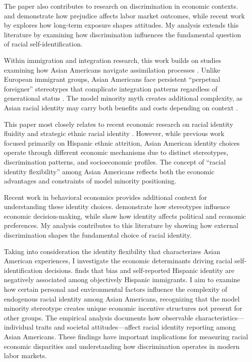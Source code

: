 The paper also contributes to research on discrimination in economic contexts. \textcite{bertrandAreEmilyGreg2004} and \textcite{charlesPrejudiceWagesEmpirical2008} demonstrate how prejudice affects labor market outcomes, while recent work by \textcite{bursztynImmigrantNextDoor2022} explores how long-term exposure shapes attitudes. My analysis extends this literature by examining how discrimination influences the fundamental question of racial self-identification.

Within immigration and integration research, this work builds on studies examining how Asian Americans navigate assimilation processes \autocite{abramitzkyCulturalAssimilationAge2016,abramitzkyNationImmigrantsAssimilation2014}. Unlike European immigrant groups, Asian Americans face persistent ``perpetual foreigner'' stereotypes that complicate integration patterns regardless of generational status \autocite{foukaImmigrantsAmericansRace2022}. The model minority myth creates additional complexity, as Asian racial identity may carry both benefits and costs depending on context \autocite{mengIntermarriageEconomicAssimilation2005}.

This paper most closely relates to recent economic research on racial identity fluidity and strategic ethnic racial identity \autocite{hadah2024hispanicidentity, antmanEthnicAttritionObserved2016,antmanIncentivesIdentifyRacial2015,antmanAmericanIndianCasinos2021}. However, while previous work focused primarily on Hispanic ethnic attrition, Asian American identity choices operate through different economic mechanisms due to distinct stereotypes, discrimination patterns, and socioeconomic profiles. The concept of ``racial identity flexibility'' among Asian Americans reflects both the economic advantages and constraints of model minority positioning.

Recent work in behavioral economics provides additional context for understanding these identity choices. \textcite{bordaloStereotypes2016} demonstrate how stereotypes influence economic decision-making, while \textcite{bonomiIdentityBeliefsPolitical2021} show how identity affects political and economic preferences. My analysis contributes to this literature by showing how external discrimination shapes the fundamental choice of racial identity.

Taking into consideration the identity flexibility that characterizes Asian American experiences, I investigate the economic determinants driving racial self-identification decisions. \textcite{hadah2024hispanicidentity} finds that bias and self-reported Hispanic identity are negatively associated among objectively Hispanic immigrants. I aim to examine how certain personal and environmental factors influence the complexity of endogenous racial identity among Asian Americans, recognizing that the model minority stereotype creates unique economic incentive structures not present for other groups. The empirical analysis documents how observable characteristics—individual traits and societal attitudes—affect racial identity reporting among Asian Americans. These findings have important implications for measuring racial economic disparities and understanding how discrimination operates in modern labor markets.

